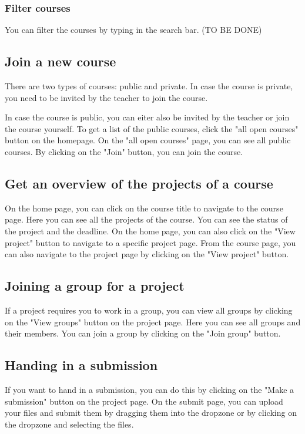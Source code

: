 \documentclass{article}
\begin{document}
\subsubsection{Filter courses}
You can filter the courses by typing in the search bar. (TO BE DONE)

\subsection{Join a new course}
There are two types of courses: public and private.
In case the course is private, you need to be invited by the teacher to join the course.

In case the course is public, you can eiter also be invited by the teacher or join the course yourself. 
To get a list of the public courses, click the "all open courses" button on the homepage.
On the "all open courses" page, you can see all public courses. By clicking on the "Join" button, you can join the course.

\subsection{Get an overview of the projects of a course}
On the home page, you can click on the course title to navigate to the course page. Here you can see all the projects of the course. You can see the status of the project and the deadline.
On the home page, you can also click on the "View project" button to navigate to a specific project page.
From the course page, you can also navigate to the project page by clicking on the "View project" button.

\subsection{Joining a group for a project}
If a project requires you to work in a group, you can view all groups by clicking on the "View groups" button on the project page. Here you can see all groups and their members. You can join a group by clicking on the "Join group" button.

\subsection{Handing in a submission}
If you want to hand in a submission, you can do this by clicking on the "Make a submission" button on the project page. On the submit page, you can upload your files and submit them by dragging them into the dropzone or by clicking on the dropzone and selecting the files.
\end{document}
